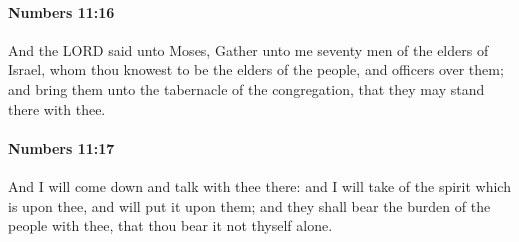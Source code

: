 		\paragraph{Numbers 11:16} %
			\label{NUMBERS-11-16}

			And the LORD said unto Moses, Gather unto me seventy men of the elders of Israel, whom thou knowest to be the elders of the people, and officers over them; and bring them unto the tabernacle of the congregation, that they may stand there with thee.


		\paragraph{Numbers 11:17} %
			\label{NUMBERS-11-17}

			And I will come down and talk with thee there: and I will take of the spirit which is upon thee, and will put it upon them; and they shall bear the burden of the people with thee, that thou bear it not thyself alone.

